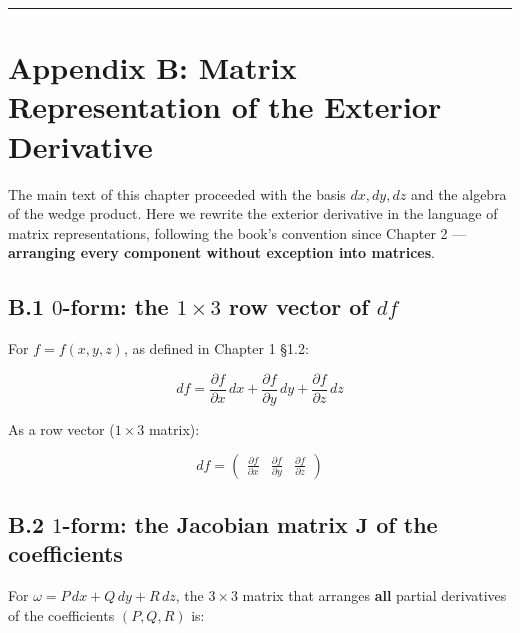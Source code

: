 \begin{center}\rule{0.5\linewidth}{0.5pt}\end{center}

\hypertarget{appendix-b-matrix-representation-of-the-exterior-derivative}{%
\section{Appendix B: Matrix Representation of the Exterior
Derivative}\label{appendix-b-matrix-representation-of-the-exterior-derivative}}

The main text of this chapter proceeded with the basis \(dx, dy, dz\)
and the algebra of the wedge product. Here we rewrite the exterior
derivative in the language of matrix representations, following the
book's convention since Chapter 2 ---
\textbf{arranging every component without exception into matrices}.

\hypertarget{b.1-0-form-the-1-times-3-row-vector-of-df}{%
\subsection{\texorpdfstring{B.1 \(0\)-form: the \(1 \times 3\) row
vector of
\(df\)}{B.1 0-form: the 1 \textbackslash times 3 row vector of df}}\label{b.1-0-form-the-1-times-3-row-vector-of-df}}

For \(f = f(x,y,z)\), as defined in Chapter 1 §1.2:

\[df = \frac{\partial f}{\partial x}\,dx + \frac{\partial f}{\partial y}\,dy + \frac{\partial f}{\partial z}\,dz\]

As a row vector (\(1 \times 3\) matrix):

\[df = \begin{pmatrix} \frac{\partial f}{\partial x} & \frac{\partial f}{\partial y} & \frac{\partial f}{\partial z} \end{pmatrix}\]

\hypertarget{b.2-1-form-the-jacobian-matrix-mathbfj-of-the-coefficients}{%
\subsection{\texorpdfstring{B.2 \(1\)-form: the Jacobian matrix
\(\mathbf{J}\) of the
coefficients}{B.2 1-form: the Jacobian matrix \textbackslash mathbf\{J\} of the coefficients}}\label{b.2-1-form-the-jacobian-matrix-mathbfj-of-the-coefficients}}

For \(\omega = P\,dx + Q\,dy + R\,dz\), the \(3 \times 3\) matrix that
arranges \textbf{all} partial derivatives of the coefficients
\((P,Q,R)\) is:

